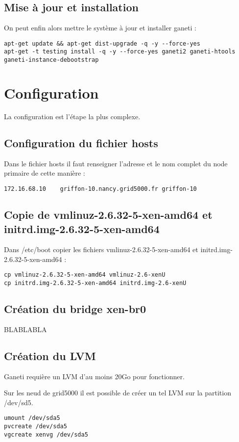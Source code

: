 \subsection{Mise à jour et installation}
On peut enfin alors mettre le système à jour et installer ganeti :

\begin{lstlisting}
apt-get update && apt-get dist-upgrade -q -y --force-yes
apt-get -t testing install -q -y --force-yes ganeti2 ganeti-htools ganeti-instance-debootstrap
\end{lstlisting}

\section{Configuration}

La configuration est l'étape la plus complexe.

\subsection{Configuration du fichier hosts}

Dans le fichier hosts il faut renseigner l'adresse et le nom complet du node primaire de cette manière :
\begin{lstlisting}
172.16.68.10    griffon-10.nancy.grid5000.fr griffon-10
\end{lstlisting}
\subsection{Copie de vmlinuz-2.6.32-5-xen-amd64 et initrd.img-2.6.32-5-xen-amd64}
Dans /etc/boot copier les fichiers vmlinuz-2.6.32-5-xen-amd64 et initrd.img-2.6.32-5-xen-amd64 :
\begin{lstlisting}
cp vmlinuz-2.6.32-5-xen-amd64 vmlinuz-2.6-xenU
cp initrd.img-2.6.32-5-xen-amd64 initrd.img-2.6-xenU
\end{lstlisting}

\subsection{Création du bridge xen-br0}
BLABLABLA
\subsection{Création du LVM}

Ganeti requière un LVM d'au moins 20Go pour fonctionner.

Sur les neud de grid5000 il est possible de créer un tel LVM sur la partition /dev/sd5.
\begin{lstlisting}
umount /dev/sda5
pvcreate /dev/sda5
vgcreate xenvg /dev/sda5
\end{lstlisting}


